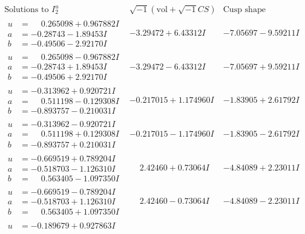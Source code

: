 \documentclass[1p]{elsarticle_modified}
\theoremstyle{definition}
\newcommand{\I}{\sqrt{-1}}
\begin{document}
$$\begin{array}{c|c|c}  
\text{Solutions to }I^u_{2}& \I (\text{vol} + \sqrt{-1}CS) & \text{Cusp shape}\\
 \hline 
\begin{aligned}
u &= \phantom{-}0.265098 + 0.967882 I \\
a &= -0.28743 - 1.89453 I \\
b &= -0.49506 - 2.92170 I\end{aligned}
 & -3.29472 + 6.43312 I & -7.05697 - 9.59211 I \\ \hline\begin{aligned}
u &= \phantom{-}0.265098 - 0.967882 I \\
a &= -0.28743 + 1.89453 I \\
b &= -0.49506 + 2.92170 I\end{aligned}
 & -3.29472 - 6.43312 I & -7.05697 + 9.59211 I \\ \hline\begin{aligned}
u &= -0.313962 + 0.920721 I \\
a &= \phantom{-}0.511198 - 0.129308 I \\
b &= -0.893757 - 0.210031 I\end{aligned}
 & -0.217015 + 1.174960 I & -1.83905 + 2.61792 I \\ \hline\begin{aligned}
u &= -0.313962 - 0.920721 I \\
a &= \phantom{-}0.511198 + 0.129308 I \\
b &= -0.893757 + 0.210031 I\end{aligned}
 & -0.217015 - 1.174960 I & -1.83905 - 2.61792 I \\ \hline\begin{aligned}
u &= -0.669519 + 0.789204 I \\
a &= -0.518703 - 1.126310 I \\
b &= \phantom{-}0.563405 - 1.097350 I\end{aligned}
 & \phantom{-}2.42460 + 0.73064 I & -4.84089 + 2.23011 I \\ \hline\begin{aligned}
u &= -0.669519 - 0.789204 I \\
a &= -0.518703 + 1.126310 I \\
b &= \phantom{-}0.563405 + 1.097350 I\end{aligned}
 & \phantom{-}2.42460 - 0.73064 I & -4.84089 - 2.23011 I \\ \hline\begin{aligned}
u &= -0.189679 + 0.927863 I \\

\end{aligned}
\end{array}$$
\end{document}
